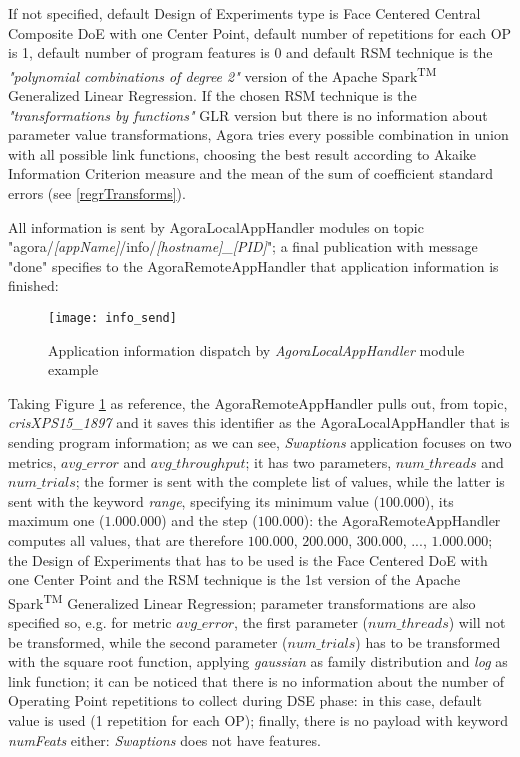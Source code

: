 If not specified, default Design of Experiments type is Face Centered Central Composite DoE with one Center Point, default number of repetitions for each OP is 1, default number of program features is 0 and default RSM technique is the \textit{"polynomial combinations of degree 2"} version of the Apache Spark\textsuperscript{TM} Generalized Linear Regression. If the chosen RSM technique is the \textit{"transformations by functions"} GLR version but there is no information about parameter value transformations, Agora tries every possible combination in union with all possible link functions, choosing the best result according to Akaike Information Criterion measure and the mean of the sum of coefficient standard errors (see \ref{regrTransforms}).

All information is sent by AgoraLocalAppHandler modules on topic "agora\slash{}\textit{[appName]}\slash{}info\slash{}\textit{[hostname]\_[PID]}"; a final publication with message "done" specifies to the AgoraRemoteAppHandler that application information is finished:

\begin{figure}[H]

    \centering
    \texttt{[image: info\_send]}
    \caption{Application information dispatch by \textit{AgoraLocalAppHandler} module example}
    \label{fig:info_send}
    
\end{figure}

Taking Figure \ref{fig:info_send} as reference, the AgoraRemoteAppHandler pulls out, from topic, \textit{crisXPS15\_1897} and it saves this identifier as the AgoraLocalAppHandler that is sending program information; as we can see, \textit{Swaptions} application focuses on two metrics, $avg\_error$ and $avg\_throughput$; it has two parameters, $num\_threads$ and $num\_trials$; the former is sent with the complete list of values, while the latter is sent with the keyword \textit{range}, specifying its minimum value ($100.000$), its maximum one ($1.000.000$) and the step ($100.000$): the Agora\-Remote\-App\-Handler computes all values, that are therefore $100.000$, $200.000$, $300.000$, ..., $1.000.000$; the Design of Experiments that has to be used is the Face Centered DoE with one Center Point and the RSM technique is the 1st version of the Apache Spark\textsuperscript{TM} Generalized Linear Regression; parameter transformations are also specified so, e.g. for metric $avg\_error$, the first parameter ($num\_threads$) will not be transformed, while the second parameter ($num\_trials$) has to be transformed with the square root function, applying \textit{gaussian} as family distribution and \textit{log} as link function; it can be noticed that there is no information about the number of Operating Point repetitions to collect during DSE phase: in this case, default value is used (1 repetition for each OP); finally, there is no payload with keyword \textit{numFeats} either: \textit{Swaptions} does not have features.

